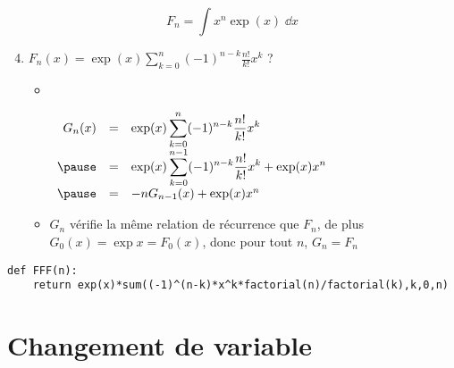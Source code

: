  
\begin{frame}[fragile]

\vspace*{-1ex}

$$F_n = \int x^n \exp(x) \; \dd x$$

\vspace*{-1ex}

\begin{enumerate}
\setcounter{enumi}{3}
  \item $\displaystyle F_n(x) = \exp(x)\sum_{k=0}^n (-1)^{n-k} \frac{n!}{k!} x^k$ ?
  
  \pause
  \vspace*{2ex} 
  
   \begin{itemize}
      \item ~ 
      
    \vspace*{-5ex}    
        
    $\begin{array}{rcl} 
    G_n(x) 
    &=& \displaystyle \exp(x)\sum_{k=0}^{n} (-1)^{n-k} \frac{n!}{k!} x^k\\
    \pause
    &=& \displaystyle \exp(x)\sum_{k=0}^{n-1} (-1)^{n-k} \frac{n!}{k!} x^k  + \exp(x)x^n \\
   \pause
    &=& -n G_{n-1}(x)+ \exp(x)x^n       
    \end{array}$
    
    \pause
    \item $G_n$ vérifie la même relation de récurrence que $F_n$,
    de plus $G_0(x)=\exp x = F_0(x)$, donc pour tout $n$, $G_n=F_n$
    \vspace*{-1ex}
    
    \end{itemize}
\end{enumerate}

\medskip 
\pause
 
\begin{algo}
\begin{lstlisting}
def FFF(n): 
    return exp(x)*sum((-1)^(n-k)*x^k*factorial(n)/factorial(k),k,0,n)
\end{lstlisting}
\end{algo}
\end{frame}


\section{Changement de variable}

